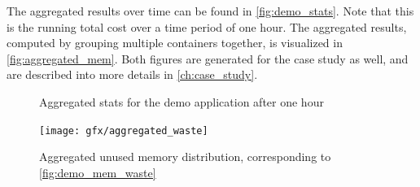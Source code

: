 \noindent
The aggregated results over time can be found in \autoref{fig:demo_stats}. Note that this is the running total cost over a time period of one hour. 
The aggregated results, computed by grouping multiple containers together, is visualized in \autoref{fig:aggregated_mem}. Both figures are generated for the case study as well, and are described into more details in \autoref{ch:case_study}.

\begin{figure}
    \centering
    
    \caption{Aggregated stats for the demo application after one hour}
    \label{fig:demo_stats}
\end{figure}

\begin{figure}
    \centering
    \texttt{[image: gfx/aggregated\_waste]}
    \caption{Aggregated unused memory distribution, corresponding to \autoref{fig:demo_mem_waste}}
    \label{fig:aggregated_mem}
\end{figure}